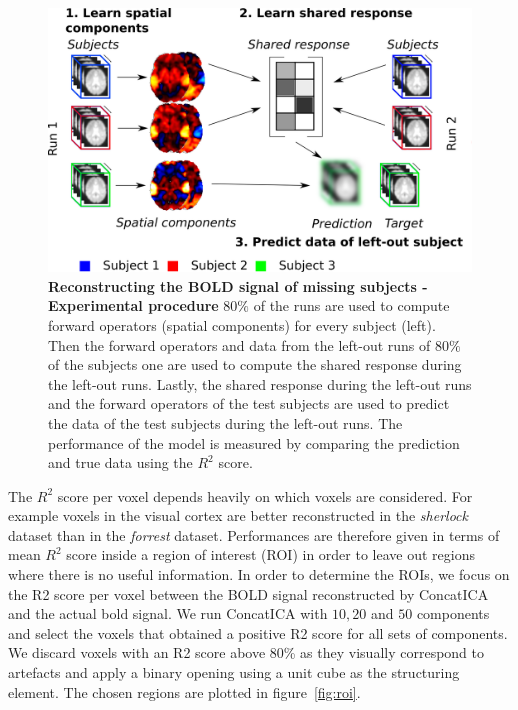 \begin{figure}
  \centering
  \includegraphics[scale=0.24]{figures/srm/conceptual_figure41.png}
  \caption{\textbf{Reconstructing the BOLD signal of missing subjects -
      Experimental procedure} $80
    \%$ of the runs are used to compute forward operators (spatial components) for every subject (left).
    Then the forward operators and data from the left-out runs of $80\%$ of the subjects one are used to compute the shared response during the left-out runs.
    Lastly, the shared response during the left-out runs and  the forward operators of the test subjects are used to predict the data of the test subjects during the left-out runs.
    The performance of the model is measured by comparing the prediction and true data using the $R^2$ score.}
  \label{fig:conceptual:reconstruction}
\end{figure}


The $R^2$ score per voxel depends heavily on which voxels are considered. For example voxels in the
visual cortex are better reconstructed in the \emph{sherlock} dataset than in
the \emph{forrest} dataset.
Performances are therefore given in terms of mean $R^2$ score inside a region of interest (ROI) in order to leave out regions where there is no useful information.
In order to determine the ROIs, we focus on the R2 score per voxel between the BOLD signal reconstructed by ConcatICA and the actual bold signal. We run ConcatICA with $10, 20$ and $50$ components and select the voxels that obtained a positive R2 score for all sets of components.
% 
We discard voxels with an R2 score above 80\% as they visually correspond to artefacts and apply a binary opening using a unit cube as the structuring element. The chosen regions are plotted in figure~\ref{fig:roi}.


